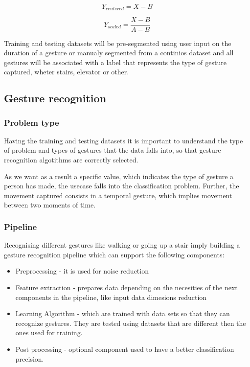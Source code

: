 \begin{equation}
Y_{centered} = X - B
\label{eq:center}
\end{equation}

\begin{equation}
Y_{scaled} = \frac{X - B}{A-B}
\label{eq:normalisation}
\end{equation}

Training and testing datasets will be pre-segmented using user input on the duration of a gesture or manualy segmented from a continios dataset and all gestures will be associated with a label that represents the type of gesture captured, wheter stairs, elevator or other.

\subsection{Gesture recognition}

\subsubsection{Problem type}
Having the training and testing datasets it is important to understand the type of problem and types of gestures that the data falls into, so that gesture recognition algotithms are correctly selected. 

As we want as a result a specific value, which indicates the type of gesture a person has made, the usecase falls into the classification problem.
Further, the movement captured consists in a temporal gesture, which implies movement between two moments of time.

\subsubsection{Pipeline}

Recognising different gestures like walking or going up a stair imply building a gesture recognition pipeline which can support the following components:
\begin{itemize}
\item Preprocessing - it is used for noise reduction
\item Feature extraction - prepares data depending on the necesities of the next components in the pipeline, like input data dimesions reduction
\item Learning Algorithm - which are trained with data sets so that they can recognize gestures. They are tested using datasets that are different then the ones used for training.
\item Post processing - optional component used to have a better classification precision.
\end{itemize}

